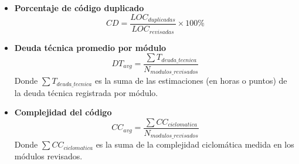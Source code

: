 \begin{itemize}
    \item \textbf{Porcentaje de código duplicado}
          \[
              CD = \frac{LOC_{duplicadas}}{LOC_{revisadas}} \times 100\%
          \]

    \item \textbf{Deuda técnica promedio por módulo}
          \[
              DT_{avg} = \frac{\sum T_{deuda\_tecnica}}{N_{modulos\_revisados}}
          \]
          Donde $\sum T_{deuda\_tecnica}$ es la suma de las estimaciones (en horas o puntos) de la deuda técnica registrada por módulo.

    \item \textbf{Complejidad del código}
          \[
              CC_{avg} = \frac{\sum CC_{ciclomatica}}{N_{modulos\_revisados}}
          \]
          Donde $\sum CC_{ciclomatica}$ es la suma de la complejidad ciclomática medida en los módulos revisados.
\end{itemize}

